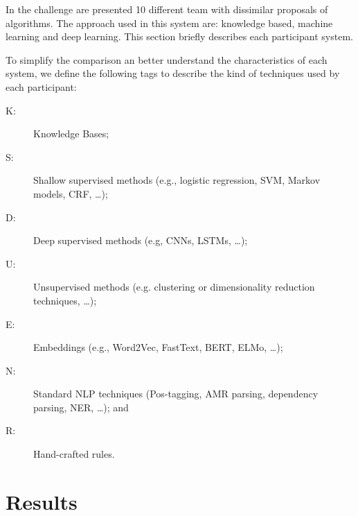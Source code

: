 \documentclass[11pt,a4paper]{article}
\begin{document}

In the challenge are presented 10 different team with dissimilar proposals of algorithms. The approach used in this system are: knowledge based, machine learning and deep learning.
This section briefly describes each participant system.

To simplify the comparison an better understand the characteristics of each system, we define the following tags to describe the kind of techniques used by each participant:

\begin{description}
    \item[K:] Knowledge Bases;
    \item[S:] Shallow supervised methods (e.g., logistic regression, SVM, Markov models, CRF, \ldots);
    \item[D:] Deep supervised methods (e.g, CNNs, LSTMs, \ldots);
    \item[U:] Unsupervised methods (e.g. clustering or dimensionality reduction techniques, \ldots);
    \item[E:] Embeddings (e.g., Word2Vec, FastText, BERT, ELMo, \ldots);
    \item[N:] Standard NLP techniques (Pos-tagging, AMR parsing, dependency parsing, NER, \ldots); and
    \item[R:] Hand-crafted rules.
\end{description}


\section{Results}
\end{document}
